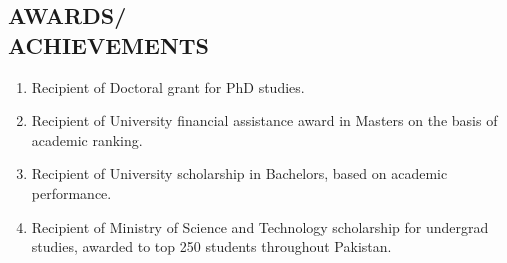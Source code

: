\documentclass[margin, 10pt]{res} %
\begin{document}
\begin{resume}

\section{AWARDS/ \\ ACHIEVEMENTS} 

\begin{enumerate}
\item Recipient of Doctoral grant for PhD studies.
\item Recipient of University financial assistance award in Masters on the basis of academic ranking.
\item Recipient of University scholarship in Bachelors, based on academic performance.
\item Recipient of Ministry of Science and Technology scholarship for undergrad studies, awarded to top 250 students throughout Pakistan.
\end{enumerate} 



\end{resume}
\end{document}
